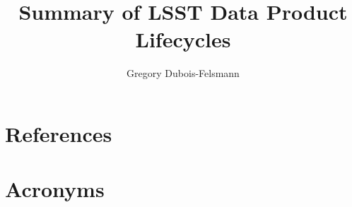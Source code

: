 \documentclass[DM,authoryear,toc]{lsstdoc}
\title{Summary of LSST Data Product Lifecycles}
\author{%
Gregory Dubois-Felsmann
}
\date{\vcsDate}
\begin{document}
\maketitle


\appendix
\section{References} \label{sec:bib}
\renewcommand{\refname}{} %


\section{Acronyms} \label{sec:acronyms}

\end{document}
